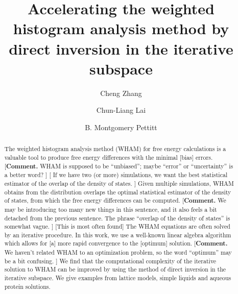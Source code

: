 \documentclass[reprint,aip,jcp,superscriptaddress]{revtex4-1}
\begin{document}
\newcommand{\vct}[1]{\mathbf{#1}}
\newcommand{\vx}{\vct{x}}
\newcommand{\vy}{\vct{y}}
\newcommand{\Z}{\mathcal{Z}}
\newcommand{\E}{\mathcal{E}}
\newcommand{\Ham}{\mathcal{H}}
\newcommand{\W}{\mathcal{W}}
\newcommand{\A}{\mathcal{A}}

\newcommand{\repl}[2]{{\color{gray} [#1] }{\color{blue} #2}}
\newcommand{\add}[1]{{\color{blue} #1}}
\newcommand{\del}[1]{{\color{gray} [#1]}}
\newcommand{\note}[1]{{\color{OliveGreen}\small [\textbf{Comment.} #1]}}



\title{Accelerating the weighted histogram analysis method
by direct inversion in the iterative subspace}


\author{Cheng Zhang}
\author{Chun-Liang Lai}
\author{B. Montgomery Pettitt}



\begin{abstract}
The weighted histogram analysis method (WHAM)
for free energy calculations
is a valuable tool to produce
free energy differences with the minimal \repl{bias}{errors}.
\note{
WHAM is supposed to be ``unbiased'';
maybe ``error'' or ``uncertainty'' is a better word?
}
%
\repl{
If we have two (or more) simulations,
we want the best statistical estimator
of the overlap of the density of states.
}
{
Given multiple simulations,
WHAM obtains
from the distribution overlaps
the optimal statistical estimator
of the density of states,
from which the free energy differences
can be computed.
}
%
\note{
We may be introducing too many new things in this sentence,
and it also feels a bit detached from the previous sentence.
The phrase ``overlap of the density of states'' is somewhat vague.
}
%
\repl{This is most often found}{The WHAM equations are often solved}
by an iterative procedure.
%
In this work,
we use a well-known linear algebra algorithm
which allows for
\repl{a}{more}
rapid convergence to the \repl{optimum}{solution}.
%
\note{
We haven't related WHAM to an optimization problem,
so the word ``optimum'' may be a bit confusing.
}
%
We find \add{that} the computational complexity of
the iterative solution to WHAM
can be improved by using the method of
direct inversion in the iterative subspace.
%
We give examples from
\add{lattice models,}
simple liquids
and aqueous protein solutions.
\end{abstract}
\end{document}
